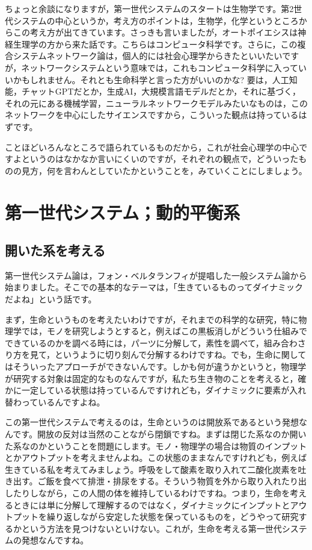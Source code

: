 \documentclass{ltjsbook}
\begin{document}
ちょっと余談になりますが，第一世代システムのスタートは生物学です。第2世代システムの中心というか，考え方のポイントは，生物学，化学というところからこの考え方が出てきています。さっきも言いましたが，オートポイエシスは神経生理学の方から来た話です。こちらはコンピュータ科学です。さらに，この複合システムネットワーク論は，個人的には社会心理学からきたといいたいですが，ネットワークシステムという意味では，これもコンピュータ科学に入っていいかもしれません。それとも生命科学と言った方がいいのかな? 要は，人工知能，チャットGPTだとか，生成AI，大規模言語モデルだとか，それに基づく，それの元にある機械学習，ニューラルネットワークモデルみたいなものは，このネットワークを中心にしたサイエンスですから，こういった観点は持っているはずです。

ことほどいろんなところで語られているものだから，これが社会心理学の中心ですよというのはなかなか言いにくいのですが，それぞれの観点で，どういったものの見方，何を言わんとしていたかということを，みていくことにしましょう。

\section{第一世代システム；動的平衡系}
\subsection{開いた系を考える}

第一世代システム論は，フォン・ベルタランフィが提唱した一般システム論から始まりました。そこでの基本的なテーマは，「生きているものってダイナミックだよね」という話です。

まず，生命というものを考えたいわけですが，それまでの科学的な研究，特に物理学では，モノを研究しようとすると，例えばこの黒板消しがどういう仕組みでできているのかを調べる時には，パーツに分解して，素性を調べて，組み合わさり方を見て，というように切り刻んで分解するわけですね。でも，生命に関してはそういったアプローチができないんです。しかも何が違うかというと，物理学が研究する対象は固定的なものなんですが，私たち生き物のことを考えると，確かに一定している状態は持っているんですけれども，ダイナミックに要素が入れ替わっているんですよね。

この第一世代システムで考えるのは，生命というのは開放系であるという発想なんです。開放の反対は当然のことながら閉鎖ですね。まずは閉じた系なのか開いた系なのかということを問題にします。モノ・物理学の場合は物質のインプットとかアウトプットを考えませんよね。この状態のままなんですけれども，例えば生きている私を考えてみましょう。呼吸をして酸素を取り入れて二酸化炭素を吐き出す。ご飯を食べて排泄・排尿をする。そういう物質を外から取り入れたり出したりしながら，この人間の体を維持しているわけですね。つまり，生命を考えるときには単に分解して理解するのではなく，ダイナミックにインプットとアウトプットを繰り返しながら安定した状態を保っているものを，どうやって研究するかという方法を見つけないといけない。これが，生命を考える第一世代システムの発想なんですね。
\end{document}
